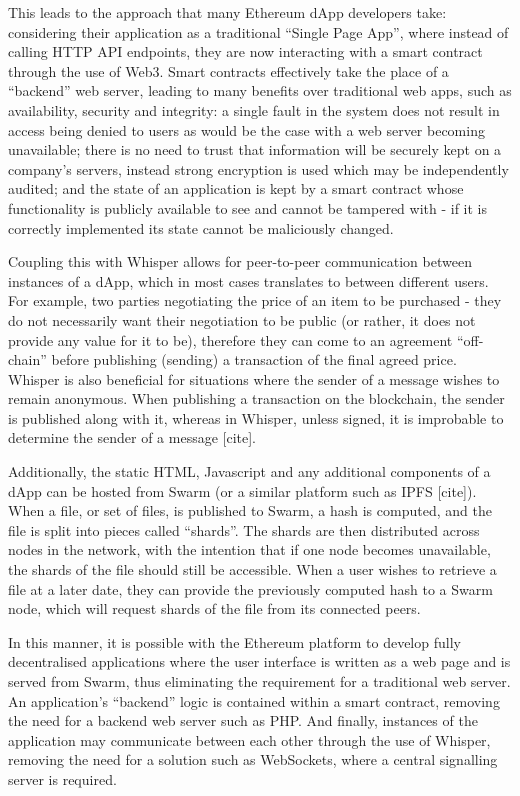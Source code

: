 This leads to the approach that many Ethereum dApp developers take: considering their application as a traditional “Single Page App”, where instead of calling HTTP API endpoints, they are now interacting with a smart contract through the use of Web3. Smart contracts effectively take the place of a “backend” web server, leading to many benefits over traditional web apps, such as availability, security and integrity: a single fault in the system does not result in access being denied to users as would be the case with a web server becoming unavailable; there is no need to trust that information will be securely kept on a company's servers, instead strong encryption is used which may be independently audited; and the state of an application is kept by a smart contract whose functionality is publicly available to see and cannot be tampered with - if it is correctly implemented its state cannot be maliciously changed.

Coupling this with Whisper allows for peer-to-peer communication between instances of a dApp, which in most cases translates to between different users. For example, two parties negotiating the price of an item to be purchased - they do not necessarily want their negotiation to be public (or rather, it does not provide any value for it to be), therefore they can come to an agreement “off-chain” before publishing (sending) a transaction of the final agreed price. Whisper is also beneficial for situations where the sender of a message wishes to remain anonymous. When publishing a transaction on the blockchain, the sender is published along with it, whereas in Whisper, unless signed, it is improbable to determine the sender of a message [cite]. %

Additionally, the static HTML, Javascript and any additional components of a dApp can be hosted from Swarm (or a similar platform such as IPFS [cite]). When a file, or set of files, is published to Swarm, a hash is computed, and the file is split into pieces called “shards”. The shards are then distributed across nodes in the network, with the intention that if one node becomes unavailable, the shards of the file should still be accessible. When a user wishes to retrieve a file at a later date, they can provide the previously computed hash to a Swarm node, which will request shards of the file from its connected peers. %

In this manner, it is possible with the Ethereum platform to develop fully decentralised applications where the user interface is written as a web page and is served from Swarm, thus eliminating the requirement for a traditional web server. An application’s “backend” logic is contained within a smart contract, removing the need for a backend web server such as PHP. And finally, instances of the application may communicate between each other through the use of Whisper, removing the need for a solution such as WebSockets, where a central signalling server is required.

